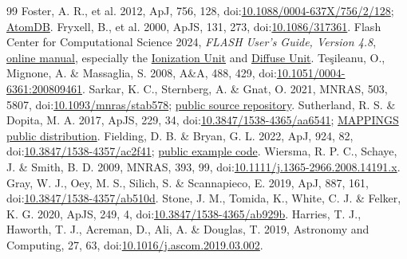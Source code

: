 \documentclass[english,a4paper]{my_memo2}
\begin{document}
\begin{thebibliography}{99}
 Foster, A. R., et al. 2012, ApJ, 756, 128, doi:\href{https://doi.org/10.1088/0004-637X/756/2/128}{10.1088/0004-637X/756/2/128}; \href{https://www.atomdb.org/}{AtomDB}.
 Fryxell, B., et al. 2000, ApJS, 131, 273, doi:\href{https://doi.org/10.1086/317361}{10.1086/317361}.
 Flash Center for Computational Science 2024, \textit{FLASH User's Guide, Version 4.8}, \href{https://flash.rochester.edu/site/flashcode/user_support/flash_ug_devel/flash4_ug.html}{online manual}, especially the \href{https://flash.rochester.edu/site/flashcode/user_support/flash_ug_devel/node120.html}{Ionization Unit} and \href{https://flash.rochester.edu/site/flashcode/user_support/flash_ug_devel/node128.html}{Diffuse Unit}.
 Te\c{s}ileanu, O., Mignone, A. \& Massaglia, S. 2008, A\&A, 488, 429, doi:\href{https://doi.org/10.1051/0004-6361:200809461}{10.1051/0004-6361:200809461}.
 Sarkar, K. C., Sternberg, A. \& Gnat, O. 2021, MNRAS, 503, 5807, doi:\href{https://doi.org/10.1093/mnras/stab578}{10.1093/mnras/stab578}; \href{https://gitlab.com/kartickchsarkar/pluto-neq-radiation}{public source repository}.
 Sutherland, R. S. \& Dopita, M. A. 2017, ApJS, 229, 34, doi:\href{https://doi.org/10.3847/1538-4365/aa6541}{10.3847/1538-4365/aa6541}; \href{https://mappings.anu.edu.au/}{MAPPINGS public distribution}.
 Fielding, D. B. \& Bryan, G. L. 2022, ApJ, 924, 82, doi:\href{https://doi.org/10.3847/1538-4357/ac2f41}{10.3847/1538-4357/ac2f41}; \href{https://github.com/dfielding14/MultiphaseGalacticWind/}{public example code}.
 Wiersma, R. P. C., Schaye, J. \& Smith, B. D. 2009, MNRAS, 393, 99, doi:\href{https://doi.org/10.1111/j.1365-2966.2008.14191.x}{10.1111/j.1365-2966.2008.14191.x}.
 Gray, W. J., Oey, M. S., Silich, S. \& Scannapieco, E. 2019, ApJ, 887, 161, doi:\href{https://doi.org/10.3847/1538-4357/ab510d}{10.3847/1538-4357/ab510d}.
 Stone, J. M., Tomida, K., White, C. J. \& Felker, K. G. 2020, ApJS, 249, 4, doi:\href{https://doi.org/10.3847/1538-4365/ab929b}{10.3847/1538-4365/ab929b}.
 Harries, T. J., Haworth, T. J., Acreman, D., Ali, A. \& Douglas, T. 2019, Astronomy and Computing, 27, 63, doi:\href{https://doi.org/10.1016/j.ascom.2019.03.002}{10.1016/j.ascom.2019.03.002}.
\end{thebibliography}
\end{document}
